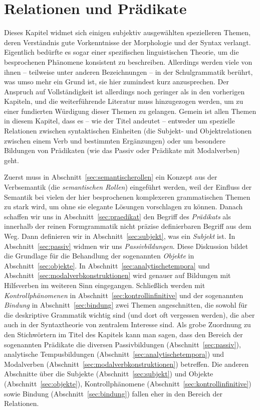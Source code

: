 \chapter{Relationen und Prädikate}

\label{sec:relationenpraedikate}

Dieses Kapitel widmet sich einigen subjektiv ausgewählten spezielleren Themen, deren Verständnis gute Vorkenntnisse der Morphologie und der Syntax verlangt.
Eigentlich bedürfte es sogar einer spezifischen linguistischen Theorie, um die besprochenen Phänomene konsistent zu beschreiben.
Allerdings werden viele von ihnen -- teilweise unter anderen Bezeichnungen -- in der Schulgrammatik berührt, was umso mehr ein Grund ist, sie hier zumindest kurz anzusprechen.
Der Anspruch auf Vollständigkeit ist allerdings noch geringer als in den vorherigen Kapiteln, und die weiterführende Literatur muss hinzugezogen werden, um zu einer fundierten Würdigung dieser Themen zu gelangen.
Gemein ist allen Themen in diesem Kapitel, dass es -- wie der Titel andeutet -- entweder um spezielle Relationen zwischen syntaktischen Einheiten (\zB die Subjekt- und Objektrelationen zwischen einem Verb und bestimmten Ergänzungen) oder um besondere Bildungen von Prädikaten (wie \zB das Passiv oder Prädikate mit Modalverben) geht.

Zuerst muss in Abschnitt~\ref{sec:semantischerollen} ein Konzept aus der Verbsemantik (die \textit{semantischen Rollen}) eingeführt werden, weil der Einfluss der Semantik bei vielen der hier besprochenen komplexeren grammatischen Themen zu stark wird, um ohne sie elegante Lösungen vorschlagen zu können.
Danach schaffen wir uns in Abschnitt~\ref{sec:praedikat} den Begriff des \textit{Prädikats} als innerhalb der reinen Formgrammatik nicht präzise definierbaren Begriff aus dem Weg.
Dann definieren wir in Abschnitt~\ref{sec:subjekt}, was ein \textit{Subjekt} ist.
In Abschnitt~\ref{sec:passiv} widmen wir uns \textit{Passivbildungen}.
Diese Diskussion bildet die Grundlage für die Behandlung der sogenannten \textit{Objekte} in Abschnitt~\ref{sec:objekte}.
In Abschnitt~\ref{sec:analytischetempora} und Abschnitt~\ref{sec:modalverbkonstruktionen} wird genauer auf Bildungen mit Hilfsverben im weiteren Sinn eingegangen.
Schließlich werden mit \textit{Kontrollphänomenen} in Abschnitt~\ref{sec:kontrollinfinitive} und der sogenannten \textit{Bindung} in Abschnitt~\ref{sec:bindung} zwei Themen angeschnitten, die sowohl für die deskriptive Grammatik wichtig sind (und dort oft vergessen werden), die aber auch in der Syntaxtheorie von zentralem Interesse sind.
Als grobe Zuordnung zu den Stichwörtern im Titel des Kapitels kann man sagen, dass den Bereich der sogenannten Prädikate die diversen Passivbildungen (Abschnitt~\ref{sec:passiv}), analytische Tempusbildungen (Abschnitt~\ref{sec:analytischetempora}) und Modalverben (Abschnitt~\ref{sec:modalverbkonstruktionen}) betreffen.
Die anderen Abschnitte über die Subjekte (Abschnitt~\ref{sec:subjekt}) und Objekte (Abschnitt~\ref{sec:objekte}), Kontrollphänomene (Abschnitt~\ref{sec:kontrollinfinitive}) sowie Bindung (Abschnitt~\ref{sec:bindung}) fallen eher in den Bereich der Relationen.

